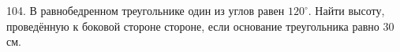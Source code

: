 104. В равнобедренном треугольнике один из углов равен $120^\circ.$ Найти высоту, проведённую к боковой стороне стороне, если основание треугольника равно 30 см.\\
